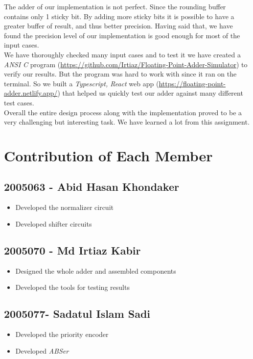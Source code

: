 \documentclass[14pt]{article}
\begin{document}
The adder of our implementation is not perfect. Since the rounding buffer contains only 1 sticky bit. By adding more sticky bits it is possible to have a greater buffer of result, and thus better precision. Having said that, we have found the precision level of our implementation is good enough for most of the input cases.\\

We have thoroughly checked many input cases and to test it we have created a \textit{ANSI C} program (\url{https://github.com/Irtiaz/Floating-Point-Adder-Simulator}) to verify our results. But the program was hard to work with since it ran on the terminal. So we built a \textit{Typescript, React} web app (\url{https://floating-point-adder.netlify.app/}) that helped us quickly test our adder against many different test cases.\\

Overall the entire design process along with the implementation proved to be a very challenging but interesting task. We have learned a lot from this assignment.

\section{Contribution of Each Member}
\subsection*{2005063 - Abid Hasan Khondaker}
\begin{itemize}
	\item Developed the normalizer circuit
	\item Developed shifter circuits
\end{itemize}
\subsection*{2005070 - Md Irtiaz Kabir}
\begin{itemize}
	\item Designed the whole adder and assembled components
	\item Developed the tools for testing results
\end{itemize}
\subsection*{2005077- Sadatul Islam Sadi}
\begin{itemize}
	\item Developed the priority encoder
	\item Developed \textit{ABSer}
\end{itemize}
\end{document}
